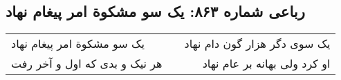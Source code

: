\begin{center}
\section*{رباعی شماره ۸۶۳: یک سو مشکوة امر پیغام نهاد}
\label{sec:0863}
\begin{longtable}{l p{0.5cm} r}
یک سو مشکوة امر پیغام نهاد
&&
یک سوی دگر هزار گون دام نهاد
\\
هر نیک و بدی که اول و آخر رفت
&&
او کرد ولی بهانه بر عام نهاد
\\
\end{longtable}
\end{center}
